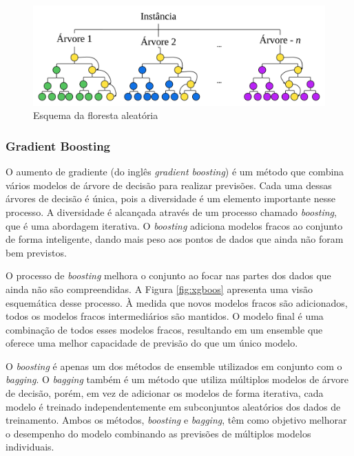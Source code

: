 \begin{figure}[H]
	\centering
	\caption{Esquema da floresta aleatória}
	\label{fig:rf}
	\includegraphics[width=\linewidth]{Modelos/Figuras/RF}
	

\end{figure}


\subsubsection{Gradient Boosting}\label{subsubsec:lgbxgb}

O aumento de gradiente (do inglês \textit{gradient boosting}) é um método que combina vários modelos de árvore de decisão para realizar previsões. Cada uma dessas árvores de decisão é única, pois a diversidade é um elemento importante nesse processo. A diversidade é alcançada através de um processo chamado \textit{boosting}, que é uma abordagem iterativa. O \textit{boosting} adiciona modelos fracos ao conjunto de forma inteligente, dando mais peso aos pontos de dados que ainda não foram bem previstos. 

O processo de \textit{boosting} melhora o conjunto ao focar nas partes dos dados que ainda não são compreendidas. A Figura \ref{fig:xgboos} apresenta uma visão esquemática desse processo. À medida que novos modelos fracos são adicionados, todos os modelos fracos intermediários são mantidos. O modelo final é uma combinação de todos esses modelos fracos, resultando em um ensemble que oferece uma melhor capacidade de previsão do que um único modelo.

O \textit{boosting} é apenas um dos métodos de ensemble utilizados em conjunto com o \textit{bagging}. O \textit{bagging} também é um método que utiliza múltiplos modelos de árvore de decisão, porém, em vez de adicionar os modelos de forma iterativa, cada modelo é treinado independentemente em subconjuntos aleatórios dos dados de treinamento. Ambos os métodos, \textit{boosting} e \textit{bagging}, têm como objetivo melhorar o desempenho do modelo combinando as previsões de múltiplos modelos individuais.


